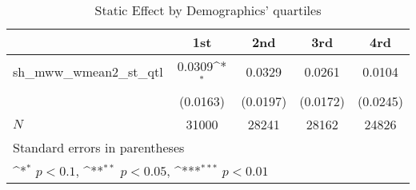 \begin{table}[htbp]\centering
\def\sym#1{\ifmmode^{#1}\else\(^{#1}\)\fi}
\caption{Static Effect by Demographics' quartiles}
\begin{tabular}{l*{4}{c}}
\hline\hline
            &\multicolumn{1}{c}{1st}&\multicolumn{1}{c}{2nd}&\multicolumn{1}{c}{3rd}&\multicolumn{1}{c}{4rd}\\
\hline
sh\_mww\_wmean2\_st\_qtl&      0.0309\sym{*}  &      0.0329         &      0.0261         &      0.0104         \\
            &    (0.0163)         &    (0.0197)         &    (0.0172)         &    (0.0245)         \\
\hline
\(N\)       &       31000         &       28241         &       28162         &       24826         \\
\hline\hline
\multicolumn{5}{l}{\footnotesize Standard errors in parentheses}\\
\multicolumn{5}{l}{\footnotesize \sym{*} \(p<0.1\), \sym{**} \(p<0.05\), \sym{***} \(p<0.01\)}\\
\end{tabular}
\end{table}

